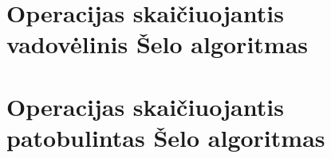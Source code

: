 \documentclass{VUMIFInfKursinis}
\begin{document}
\printbibliography[heading=bibintoc] %

\appendix  %

\section{Operacijas skaičiuojantis vadovėlinis Šelo algoritmas}

\section{Operacijas skaičiuojantis patobulintas Šelo algoritmas}
\end{document}
